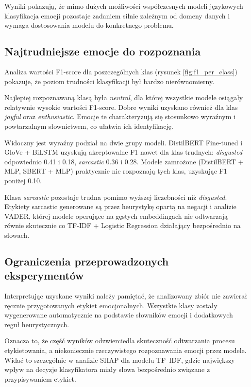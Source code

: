 \documentclass[a4paper,12pt]{article}
\begin{document}
Wyniki pokazują, że mimo dużych możliwości współczesnych modeli językowych klasyfikacja emocji pozostaje zadaniem silnie zależnym od domeny danych i wymaga dostosowania modelu do konkretnego problemu.

\subsection{Najtrudniejsze emocje do rozpoznania}

Analiza wartości F1-score dla poszczególnych klas (rysunek \ref{fig:f1_per_class}) pokazuje, że poziom trudności klasyfikacji był bardzo nierównomierny.

Najlepiej rozpoznawaną klasą była \textit{neutral}, dla której wszystkie modele osiągały relatywnie wysokie wartości F1-score. Dobre wyniki uzyskano również dla klas \textit{joyful} oraz \textit{enthusiastic}. Emocje te charakteryzują się stosunkowo wyraźnym i powtarzalnym słownictwem, co ułatwia ich identyfikację.

Widoczny jest wyraźny podział na dwie grupy modeli. DistilBERT Fine-tuned i GloVe + BiLSTM uzyskują akceptowalne F1 nawet dla klas trudnych: \textit{disgusted} odpowiednio 0.41 i 0.18, \textit{sarcastic} 0.36 i 0.28. Modele zamrożone (DistilBERT + MLP, SBERT + MLP) praktycznie nie rozpoznają tych klas, uzyskując F1 poniżej 0.10.

Klasa \textit{sarcastic} pozostaje trudna pomimo wyższej liczebności niż \textit{disgusted}. Etykiety sarcastic generowane są przez heurystykę opartą na negacji i analizie VADER, której modele operujące na gęstych embeddingach nie odtwarzają równie skutecznie co TF-IDF + Logistic Regression działający bezpośrednio na słowach.

\subsection{Ograniczenia przeprowadzonych eksperymentów}

Interpretując uzyskane wyniki należy pamiętać, że analizowany zbiór nie zawierał ręcznie przygotowanych etykiet emocjonalnych. Wszystkie klasy zostały wygenerowane automatycznie na podstawie słowników emocji i dodatkowych reguł heurystycznych.

Oznacza to, że część wyników odzwierciedla skuteczność odtwarzania procesu etykietowania, a niekoniecznie rzeczywistego rozpoznawania emocji przez modele. Widać to szczególnie w analizie SHAP dla modelu TF--IDF, gdzie największy wpływ na decyzje klasyfikatora miały słowa bezpośrednio związane z przypisywaniem etykiet.
\end{document}
